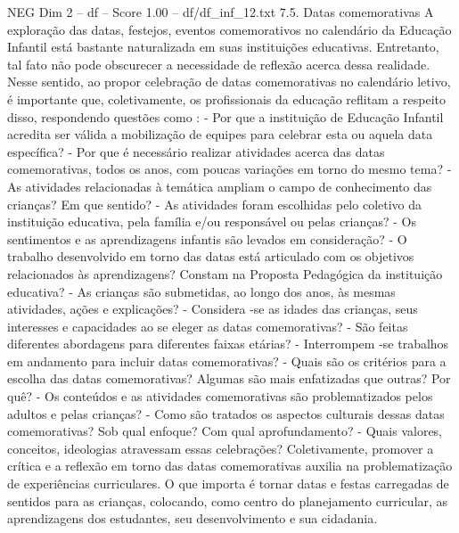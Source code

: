 \begin{textsample}{NEG Dim 2 – df – Score 1.00 – df/df\_inf\_12.txt}  \label{ex:f2_neg_168}
7.5.
Datas comemorativas A exploração das datas, festejos, eventos comemorativos no calendário da Educação Infantil está bastante naturalizada em suas instituições educativas.
Entretanto, tal fato não pode obscurecer a necessidade de reflexão acerca dessa realidade.
Nesse sentido, ao propor celebração de datas comemorativas no calendário letivo, é importante que, coletivamente, os profissionais da educação reflitam a respeito disso, respondendo questões como : - Por que a instituição de Educação Infantil acredita ser válida a mobilização de equipes para celebrar esta ou aquela data específica? - Por que é necessário realizar atividades acerca das datas comemorativas, todos os anos, com poucas variações em torno do mesmo tema? - As atividades relacionadas à temática ampliam o campo de conhecimento das crianças?
Em que sentido? - As atividades foram escolhidas pelo coletivo da instituição educativa, pela família e/ou responsável ou pelas crianças? - Os sentimentos e as aprendizagens infantis são levados em consideração? - O trabalho desenvolvido em torno das datas está articulado com os objetivos relacionados às aprendizagens?
Constam na Proposta Pedagógica da instituição educativa? - As crianças são submetidas, ao longo dos anos, às mesmas atividades, ações e explicações? - Considera -se as idades das crianças, seus interesses e capacidades ao se eleger as datas comemorativas? - São feitas diferentes abordagens para diferentes faixas etárias? - Interrompem -se trabalhos em andamento para incluir datas comemorativas? - Quais são os critérios para a escolha das datas comemorativas?
Algumas são mais enfatizadas que outras?
Por quê? - Os conteúdos e as atividades comemorativas são problematizados pelos adultos e pelas crianças? - Como são tratados os aspectos culturais dessas datas comemorativas?
Sob qual enfoque?
Com qual aprofundamento? - Quais valores, conceitos, ideologias atravessam essas celebrações?
Coletivamente, promover a crítica e a reflexão em torno das datas comemorativas auxilia na problematização de experiências curriculares.
O que importa é tornar datas e festas carregadas de sentidos para as crianças, colocando, como centro do planejamento curricular, as aprendizagens dos estudantes, seu desenvolvimento e sua cidadania.

\end{textsample}
